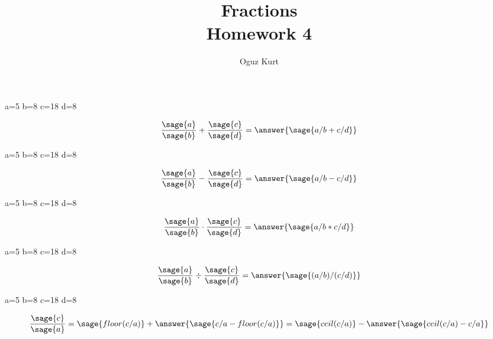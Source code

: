 \documentclass{ximera}
\title{Fractions \\ Homework 4}
\author{Oguz Kurt}
\begin{document}
\maketitle



\begin{problem}
\begin{sagesilent}
a=5
b=8
c=18
d=8
\end{sagesilent}
\begin{prompt}
$$\frac{\sage{a}}{\sage{b}}+\frac{\sage{c}}{\sage{d}}=\answer{\sage{a/b+c/d}}$$
\end{prompt}
\end{problem}

\begin{problem}
\begin{sagesilent}
a=5
b=8
c=18
d=8
\end{sagesilent}
\begin{prompt}
$$\frac{\sage{a}}{\sage{b}}-\frac{\sage{c}}{\sage{d}}=\answer{\sage{a/b-c/d}}$$
\end{prompt}
\end{problem}

\begin{problem}
\begin{sagesilent}
a=5
b=8
c=18
d=8
\end{sagesilent}
\begin{prompt}
$$\frac{\sage{a}}{\sage{b}}\cdot\frac{\sage{c}}{\sage{d}}=\answer{\sage{a/b*c/d}}$$
\end{prompt}
\end{problem}

\begin{problem}
\begin{sagesilent}
a=5
b=8
c=18
d=8
\end{sagesilent}
\begin{prompt}
$$\frac{\sage{a}}{\sage{b}}\div\frac{\sage{c}}{\sage{d}}=\answer{\sage{(a/b)/(c/d)}}$$
\end{prompt}
\end{problem}

\begin{problem}
\begin{sagesilent}
a=5
b=8
c=18
d=8
\end{sagesilent}
\begin{prompt}
$$\frac{\sage{c}}{\sage{a}}=\sage{floor(c/a)}+\answer{\sage{c/a-floor(c/a)}}=\sage{ceil(c/a)}-\answer{\sage{ceil(c/a)-c/a}} $$
\end{prompt}
\end{problem}
\end{document}

